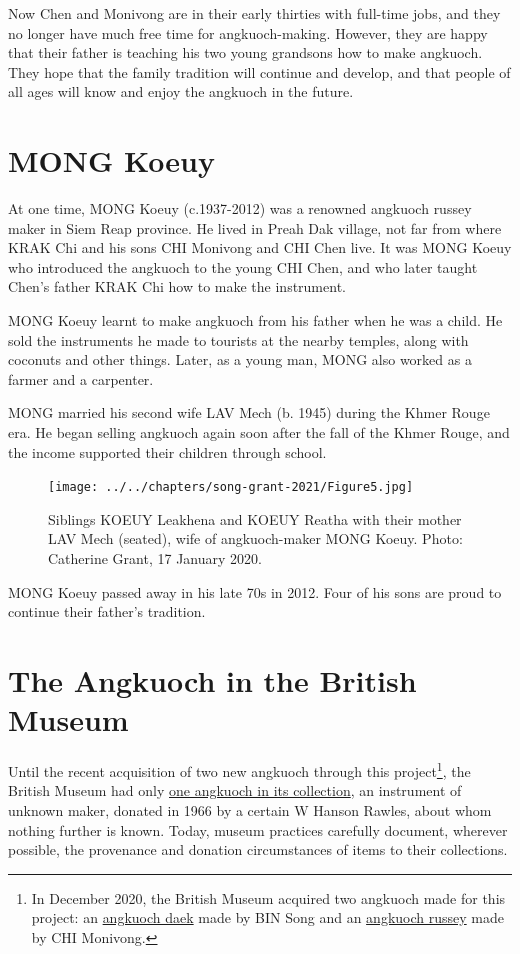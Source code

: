\documentclass[twoside]{article}
\begin{document}
Now Chen and Monivong are in their early thirties with full-time jobs,
and they no longer have much free time for angkuoch-making. However,
they are happy that their father is teaching his two young grandsons how
to make angkuoch. They hope that the family tradition will continue and
develop, and that people of all ages will know and enjoy the angkuoch in
the future.

\hypertarget{mong-koeuy}{%
\section*{MONG Koeuy}\label{mong-koeuy}}

At one time, MONG Koeuy (c.1937-2012) was a renowned angkuoch russey
maker in Siem Reap province. He lived in Preah Dak village, not far from
where KRAK Chi and his sons CHI Monivong and CHI Chen live. It was MONG
Koeuy who introduced the angkuoch to the young CHI Chen, and who later
taught Chen's father KRAK Chi how to make the instrument.

MONG Koeuy learnt to make angkuoch from his father when he was a child.
He sold the instruments he made to tourists at the nearby temples, along
with coconuts and other things. Later, as a young man, MONG also worked
as a farmer and a carpenter.

MONG married his second wife LAV Mech (b. 1945) during the Khmer Rouge
era. He began selling angkuoch again soon after the fall of the Khmer
Rouge, and the income supported their children through school.

\begin{figure}
  \texttt{[image: ../../chapters/song-grant-2021/Figure5.jpg]}
  \caption{Siblings KOEUY Leakhena
  and KOEUY Reatha with their mother LAV Mech (seated), wife of
  angkuoch-maker MONG Koeuy. Photo: Catherine Grant, 17 January 2020.}
\end{figure}

MONG Koeuy passed away in his late 70s in 2012. Four of his sons are
proud to continue their father's tradition.

\hypertarget{the-angkuoch-in-the-british-museum}{%
\section*{The Angkuoch in the British
Museum}\label{the-angkuoch-in-the-british-museum}}

Until the recent acquisition of two new angkuoch through this
project\footnote{In December 2020, the British Museum acquired two
  angkuoch made for this project: an
  \href{https://www.britishmuseum.org/collection/object/A_2020-3017-2}{angkuoch
  daek} made by BIN Song and an
  \href{https://www.britishmuseum.org/collection/object/A_2020-3017-1}{angkuoch
  russey} made by CHI Monivong.}, the British Museum had only
\href{https://www.britishmuseum.org/collection/object/A_As1966-11-5}{one
angkuoch in its collection}, an instrument of unknown maker, donated in
1966 by a certain W Hanson Rawles, about whom nothing further is known.
Today, museum practices carefully document, wherever possible, the
provenance and donation circumstances of items to their collections.
\end{document}
